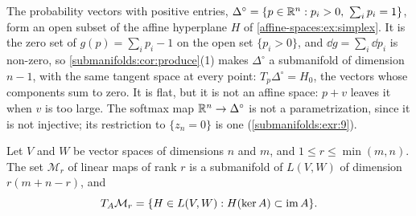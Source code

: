 \begin{notechapter}
\begin{example}\label{submanifolds:ex:simplex}
The probability vectors with positive entries,
$\Delta^\circ = \{p\in\mathbb{R}^n : p_i > 0,\ \sum_ip_i = 1\}$, form an open
subset of the affine hyperplane $H$ of \cref{affine-spaces:ex:simplex}.
It is the zero set of $g(p) = \sum_ip_i - 1$ on the open set
$\{p_i > 0\}$, and $\dd g = \sum_i\dd p_i$ is non-zero, so
\cref{submanifolds:cor:produce}(1) makes $\Delta^\circ$ a submanifold
of dimension $n - 1$, with the same tangent
space at every point: $T_p\Delta^\circ = H_0$, the vectors
whose components sum to zero. It is flat, but it is not an affine space:
$p + v$ leaves it when $v$ is too large. The softmax map
$\mathbb{R}^n\to\Delta^\circ$ is not a parametrization, since it is not injective;
its restriction to $\{z_n = 0\}$ is one (\cref{submanifolds:exr:9}).
\end{example}

\begin{theorem}\label{submanifolds:thm:rank}
Let $V$ and $W$ be vector spaces of dimensions $n$ and $m$, and
$1\leq r\leq\min(m, n)$. The set $\mathcal M_r$ of linear maps of rank $r$
is a submanifold of $L(V, W)$ of dimension $r(m + n - r)$, and
\[
  T_A\mathcal M_r = \{H\in L(V, W) : H(\ker A)\subset\operatorname{im} A\} .
\]
\end{theorem}


\end{notechapter}
